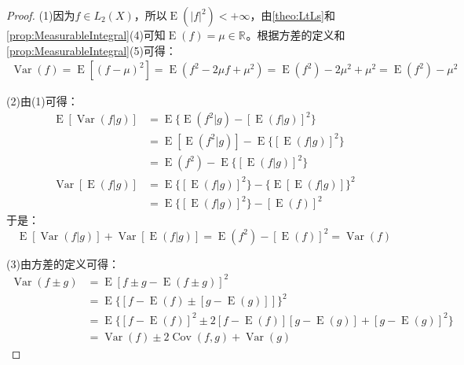\begin{proof}
	(1)因为$f\in L_2(X)$，所以$\operatorname{E}(|f|^2)<+\infty$，由\cref{theo:LtLs}和\cref{prop:MeasurableIntegral}(4)可知$\operatorname{E}(f)=\mu\in\mathbb{R}^{}$。根据方差的定义和\cref{prop:MeasurableIntegral}(5)可得：
	\begin{align*}
		\operatorname{Var}(f)
		=\operatorname{E}[(f-\mu)^2]
		=\operatorname{E}(f^2-2\mu f+\mu^2)
		=\operatorname{E}(f^2)-2\mu^2+\mu^2
		=\operatorname{E}(f^2)-\mu^2
	\end{align*}\par
	(2)由(1)可得：
	\begin{align*}
		\operatorname{E}[\operatorname{Var}(f|g)]
		&=\operatorname{E}\{\operatorname{E}(f^2|g)-[\operatorname{E}(f|g)]^2\} \\
		&=\operatorname{E}[\operatorname{E}(f^2|g)]-\operatorname{E}\{[\operatorname{E}(f|g)]^2\} \\
		&=\operatorname{E}(f^2)-\operatorname{E}\{[\operatorname{E}(f|g)]^2\} \\
		\operatorname{Var}[\operatorname{E}(f|g)]
		&=\operatorname{E}\{[\operatorname{E}(f|g)]^2\}-\{\operatorname{E}[\operatorname{E}(f|g)]\}^2 \\
		&=\operatorname{E}\{[\operatorname{E}(f|g)]^2\}-[\operatorname{E}(f)]^2
	\end{align*}
	于是：
	\begin{equation*}
		\operatorname{E}[\operatorname{Var}(f|g)]+\operatorname{Var}[\operatorname{E}(f|g)]=\operatorname{E}(f^2)-[\operatorname{E}(f)]^2=\operatorname{Var}(f)
	\end{equation*}\par
	(3)由方差的定义可得：
	\begin{align*}
		\operatorname{Var}(f\pm g)
		&=\operatorname{E}[f\pm g-\operatorname{E}(f\pm g)]^2 \\
		&=\operatorname{E}\{[f-\operatorname{E}(f)\pm[g-\operatorname{E}(g)]]\}^2 \\
		&=\operatorname{E}\{[f-\operatorname{E}(f)]^2\pm 2[f-\operatorname{E}(f)][g-\operatorname{E}(g)]+[g-\operatorname{E}(g)]^2\} \\
		&=\operatorname{Var}(f)\pm2\operatorname{Cov}(f,g)+\operatorname{Var}(g)
	\end{align*}
\end{proof}


